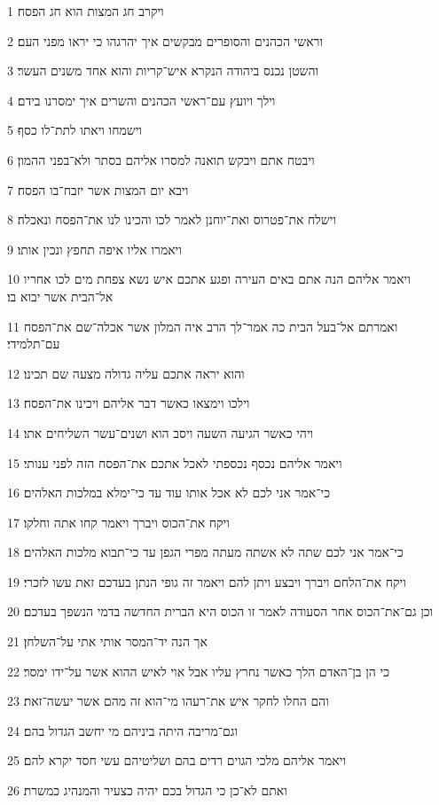 \par 1 ויקרב חג המצות הוא חג הפסח׃
\par 2 וראשי הכהנים והסופרים מבקשים איך יהרגהו כי יראו מפני העם׃
\par 3 והשטן נכנס ביהודה הנקרא איש־קריות והוא אחד משנים העשר׃
\par 4 וילך ויועץ עם־ראשי הכהנים והשרים איך ימסרנו בידם׃
\par 5 וישמחו ויאתו לתת־לו כסף׃
\par 6 ויבטח אתם ויבקש תואנה למסרו אליהם בסתר ולא־בפני ההמון׃
\par 7 ויבא יום המצות אשר יזבח־בו הפסח׃
\par 8 וישלח את־פטרוס ואת־יוחנן לאמר לכו והכינו לנו את־הפסח ונאכלה׃
\par 9 ויאמרו אליו איפה תחפץ ונכין אותו׃
\par 10 ויאמר אליהם הנה אתם באים העירה ופגע אתכם איש נשא צפחת מים לכו אחריו אל־הבית אשר יבוא בו׃
\par 11 ואמרתם אל־בעל הבית כה אמר־לך הרב איה המלון אשר אכלה־שם את־הפסח עם־תלמידי׃
\par 12 והוא יראה אתכם עליה גדולה מצעה שם תכינו׃
\par 13 וילכו וימצאו כאשר דבר אליהם ויכינו את־הפסח׃
\par 14 ויהי כאשר הגיעה השעה ויסב הוא ושנים־עשר השליחים אתו׃
\par 15 ויאמר אליהם נכסף נכספתי לאכל אתכם את־הפסח הזה לפני ענותי׃
\par 16 כי־אמר אני לכם לא אכל אותו עוד עד כי־ימלא במלכות האלהים׃
\par 17 ויקח את־הכוס ויברך ויאמר קחו אתה וחלקו׃
\par 18 כי־אמר אני לכם שתה לא אשתה מעתה מפרי הגפן עד כי־תבוא מלכות האלהים׃
\par 19 ויקח את־הלחם ויברך ויבצע ויתן להם ויאמר זה גופי הנתן בעדכם זאת עשו לזכרי׃
\par 20 וכן גם־את־הכוס אחר הסעודה לאמר זו הכוס היא הברית החדשה בדמי הנשפך בעדכם׃
\par 21 אך הנה יד־המסר אותי אתי על־השלחן׃
\par 22 כי הן בן־האדם הלך כאשר נחרץ עליו אבל אוי לאיש ההוא אשר על־ידו ימסר׃
\par 23 והם החלו לחקר איש את־רעהו מי־הוא זה מהם אשר יעשה־זאת׃
\par 24 וגם־מריבה היתה ביניהם מי יחשב הגדול בהם׃
\par 25 ויאמר אליהם מלכי הגוים רדים בהם ושליטיהם עשי חסד יקרא להם׃
\par 26 ואתם לא־כן כי הגדול בכם יהיה כצעיר והמנהיג כמשרת׃

